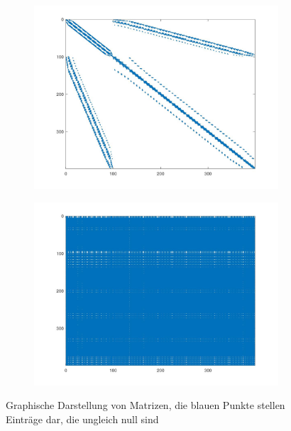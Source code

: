 \begin{figure}[h]
	\begin{subfigure}[c]{.48\textwidth}
		\centering
		\includegraphics[width=\textwidth]{data/MatrixBsp}
		\label{fig:bspMat}
	\end{subfigure}
	\begin{subfigure}[c]{.48\textwidth}
		\centering
		\includegraphics[width=\textwidth]{data/MatrixInv}
		\label{fig:inv}\vspace{12pt}
	\end{subfigure}
	\caption{Graphische Darstellung von Matrizen, die blauen Punkte stellen Einträge dar, die ungleich null sind}
\end{figure} \\ 
